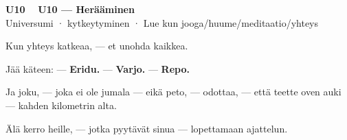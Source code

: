 \documentclass[a4paper,11pt]{article}
\begin{document}
\filbreak
\vspace{0.9mm}
\noindent
\begin{tcolorbox}[
  colframe=unicol,
  colback=white,
  boxrule=0.8pt,
  arc=0pt,
  outer arc=0pt,
  left=2.5mm, right=2.5mm, top=2mm, bottom=2mm,
  boxsep=0.5mm,
  sharp corners,
  enhanced,
  breakable=false
]
{\large\ttfamily\bfseries U10}~~
{\normalsize\bfseries U10 --- Herääminen}\\[0.2em]
{\small\color{black!65} Universumi · kytkeytyminen · Lue kun jooga/huume/meditaatio/yhteys}\\[0.35em]
{\normalsize\raggedright Kun yhteys katkeaa, --- et unohda kaikkea.

Jää käteen: --- \textbf{Eridu.} --- \textbf{Varjo.} --- \textbf{Repo.}

Ja joku, --- joka ei ole jumala --- eikä peto, --- odottaa, --- että teette oven auki --- kahden kilometrin alta.

Älä kerro heille, --- jotka pyytävät sinua --- lopettamaan ajattelun.}
\end{tcolorbox}

\filbreak
\end{document}
